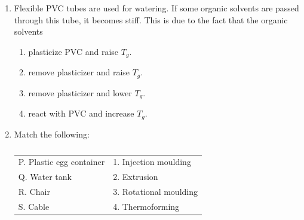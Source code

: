\documentclass[a4paper,10pt]{article}
\begin{document}
\begin{enumerate}
    \item Flexible PVC tubes are used for watering. If some organic solvents are passed through this tube, it becomes stiff. This is due to the fact that the organic solvents
    \hfill{}
    \begin{enumerate}[label=\Alph*)]
        \item plasticize PVC and raise $T_g$.
        \item remove plasticizer and raise $T_g$.
        \item remove plasticizer and lower $T_g$.
        \item react with PVC and increase $T_g$.
    \end{enumerate}

    \item Match the following:
    \begin{table}[h!] \centering \caption*{} \label{tab:q13_poly_2018}
        \begin{tabular}{|l|l|} \hline
        P. Plastic egg container & 1. Injection moulding \\
        Q. Water tank & 2. Extrusion \\
        R. Chair & 3. Rotational moulding \\
        S. Cable & 4. Thermoforming \\ \hline
        \end{tabular}
    \end{table}
    \hfill{}
    \begin{enumerate}[label=\Alph*)]
    \end{enumerate}


\end{enumerate}
\end{document}
